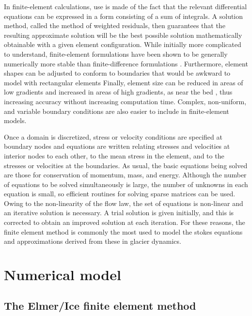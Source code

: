 \documentclass{article}
\begin{document}
In ﬁnite-element calculations, use is made of the fact
that the relevant differential equations can be expressed in a form consisting of a sum of integrals. A solution method, called the method of weighted residuals, then guarantees that the resulting approximate solution will be the best possible solution mathematically obtainable with a given element configuration. While initially more complicated to understand, ﬁnite-element formulations have been shown to be generally numerically more stable than ﬁnite-difference formulations \cite{hooke2019principles}. Furthermore, element shapes can be adjusted to conform to boundaries that would be awkward to model with rectangular elements Finally, element size can be reduced in areas of low gradients and increased in areas of high gradients, as near the bed , thus increasing accuracy without increasing computation time. Complex, non-uniform, and variable boundary conditions are also easier to include in ﬁnite-element models.

Once a domain is discretized, stress or velocity conditions are specified at boundary nodes and equations are written relating stresses and velocities at interior nodes to each other, to the mean stress in the element, and to the stresses or velocities at the boundaries. As usual, the basic equations being solved are those for conservation of momentum, mass, and energy. Although the number of equations to be solved simultaneously is large, the number of unknowns in each equation is small, so efficient routines for solving sparse matrices can be used. Owing to the non-linearity of the ﬂow law, the set of equations is non-linear and an iterative solution is necessary. A trial solution is given initially, and this is corrected to obtain an improved solution at each iteration. For these reasons, the finite element method is commonly the most used to model the stokes equations and approximations derived from these in glacier dynamics. 

\section{Numerical model}
\label{Numerical_model}
\subsection{The Elmer/Ice finite element method}
\end{document}

